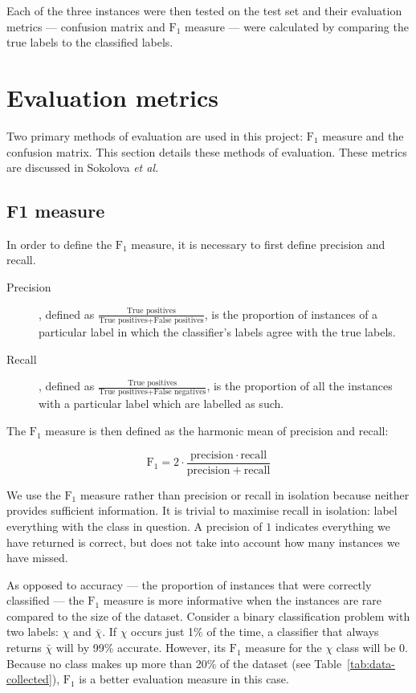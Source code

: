     Each of the three instances were then tested on the test set and their evaluation metrics --- confusion matrix and $\mathrm{F}_1$ measure --- were calculated by comparing the true labels to the classified labels.
  \section{Evaluation metrics}
    Two primary methods of evaluation are used in this project: $\mathrm{F}_1$ measure and the confusion matrix.
    This section details these methods of evaluation. These metrics are discussed in Sokolova \emph{et al.}\cite{sokolova2009systematic}
    \subsection{F1 measure}
      In order to define the $\mathrm{F}_1$ measure, it is necessary to first define precision and recall.
      \begin{description}
        \item[Precision], defined as $\frac{\text{True positives}}{\text{True positives} + \text{False positives}}$, is the proportion of instances of a particular label in which the classifier's labels agree with the true labels.
        \item[Recall], defined as $\frac{\text{True positives}}{\text{True positives} + \text{False negatives}}$, is the proportion of all the instances with a particular label which are labelled as such. 
      \end{description}
      
      The $\mathrm{F}_1$ measure is then defined as the harmonic mean of precision and recall:
      
      $$\mathrm{F}_1 = 2 \cdot \frac{\mathrm{precision} \cdot \mathrm{recall}}{\mathrm{precision} + \mathrm{recall}}$$
      
      We use the $\mathrm{F}_1$ measure rather than precision or recall in isolation because neither provides sufficient information. It is trivial to maximise recall in isolation: label everything with the class in question. A precision of $1$ indicates everything we have returned is correct, but does not take into account how many instances we have missed.
      
      As opposed to accuracy --- the proportion of instances that were correctly classified --- the $\mathrm{F}_1$ measure is more informative when the instances are rare compared to the size of the dataset. Consider a binary classification problem with two labels: $\chi$ and $\bar{\chi}$. If $\chi$ occurs just 1\% of the time, a classifier that always returns $\bar{\chi}$ will by 99\% accurate. However, its  $\mathrm{F}_1$ measure for the $\chi$ class will be 0. Because no class makes up more than 20\% of the dataset (see Table~\ref{tab:data-collected}), $\mathrm{F}_1$ is a better evaluation measure in this case.
    
